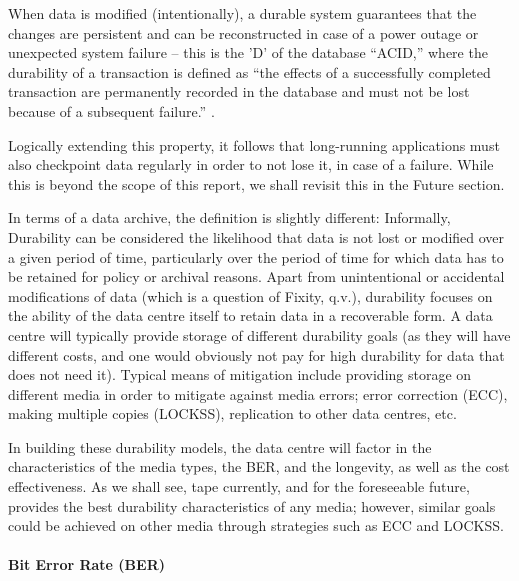When data is modified (intentionally),
a durable system guarantees that the changes are persistent and can be reconstructed in case of a power outage or unexpected system failure
-- this is the 'D' of the database ``ACID,'' where the durability of a transaction is defined as ``the effects of a
successfully completed transaction are permanently recorded in the database and must not be lost because of a subsequent
failure.'' \cite{connolly}.

Logically extending this property, it follows that long-running applications must also checkpoint data regularly in
order to not lose it, in case of a failure.  While this is
beyond the scope of this report, we shall revisit this in the Future section.



In terms of a data archive, the definition is slightly different:
Informally, Durability can be considered the likelihood that data is not lost or modified over a given period of time, particularly over the period of time for which data has to be retained for policy or archival reasons.  Apart from unintentional or accidental modifications of data (which is a question of Fixity, q.v.), durability focuses on the ability of the data centre itself to retain data in a recoverable form.  A data centre will typically provide storage of different durability goals (as they will have different costs, and one would obviously not pay for high durability for data that does not need it).  Typical means of mitigation include providing storage on different media in order to mitigate against media errors; error correction (ECC), making multiple copies (LOCKSS), replication to other data centres, etc.

In building these durability models, the data centre will factor in the characteristics of the media types, the BER, and the longevity, as well as the cost effectiveness.
As we shall see, tape currently, and for the
foreseeable future, provides the best durability characteristics of any media; however, similar goals could be achieved on other media through strategies such as ECC and LOCKSS.

\paragraph{Bit Error Rate (BER)}

